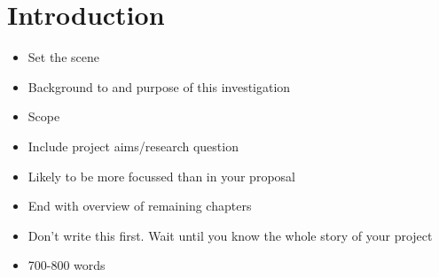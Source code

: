 \section{Introduction}

\begin{itemize}
    \item Set the scene 
    \item Background to and purpose of this investigation
    \item Scope
    \item Include project aims/research question
    \item Likely to be more focussed than in your proposal
    \item End with overview of remaining chapters
    \item Don't write this first. Wait until you know the whole story of your project
    \item 700-800 words
\end{itemize}